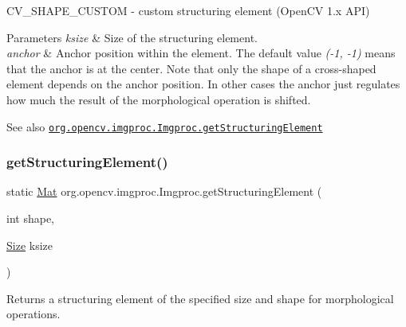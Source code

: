 \begin{DoxyItemize}
\item C\+V\+\_\+\+S\+H\+A\+P\+E\+\_\+\+C\+U\+S\+T\+OM -\/ custom structuring element (Open\+CV 1.\+x A\+PI) 
\end{DoxyItemize}
\begin{DoxyParams}{Parameters}
{\em ksize} & Size of the structuring element. \\
\hline
{\em anchor} & Anchor position within the element. The default value {\itshape (-\/1, -\/1)} means that the anchor is at the center. Note that only the shape of a cross-\/shaped element depends on the anchor position. In other cases the anchor just regulates how much the result of the morphological operation is shifted.\\
\hline
\end{DoxyParams}
\begin{DoxySeeAlso}{See also}
\href{http://docs.opencv.org/modules/imgproc/doc/filtering.html#getstructuringelement}{\tt org.\+opencv.\+imgproc.\+Imgproc.\+get\+Structuring\+Element} 
\end{DoxySeeAlso}
\mbox{\label{classorg_1_1opencv_1_1imgproc_1_1_imgproc_a4e25f50f644c596500ea7cbb7d8f72cf}} 
\subsubsection{\texorpdfstring{get\+Structuring\+Element()}{getStructuringElement()}\hspace{0.1cm}{\footnotesize\ttfamily [2/2]}}
{\footnotesize\ttfamily static \mbox{\hyperlink{classorg_1_1opencv_1_1core_1_1_mat}{Mat}} org.\+opencv.\+imgproc.\+Imgproc.\+get\+Structuring\+Element (\begin{DoxyParamCaption}\item[{int}]{shape,  }\item[{\mbox{\hyperlink{classorg_1_1opencv_1_1core_1_1_size}{Size}}}]{ksize }\end{DoxyParamCaption})\hspace{0.3cm}{\ttfamily [static]}}

Returns a structuring element of the specified size and shape for morphological operations.

